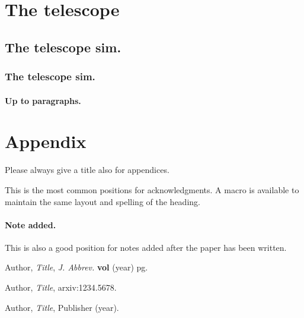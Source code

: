 \documentclass[a4paper,11pt]{article}
\begin{document}
\section{The telescope}
\subsection{The telescope sim.}
\subsubsection{The telescope sim.}
\paragraph{Up to paragraphs.} 


\appendix
\section{Appendix}
Please always give a title also for appendices.

\acknowledgments

This is the most common positions for acknowledgments. A macro is
available to maintain the same layout and spelling of the heading.

\paragraph{Note added.} This is also a good position for notes added
after the paper has been written.




\begin{thebibliography}{99}

Author, \emph{Title}, \emph{J. Abbrev.} {\bf vol} (year) pg.

Author, \emph{Title},
arxiv:1234.5678.

Author, \emph{Title},
Publisher (year).





\end{thebibliography}
\end{document}
